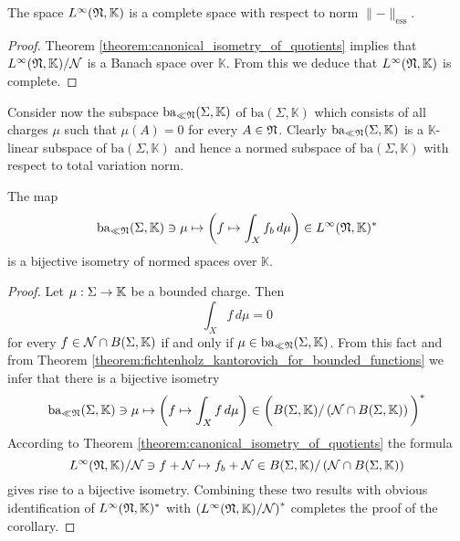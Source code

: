 \begin{corollary}\label{corollary:L_infty_is_complete}
    The space $L^{\infty}({\mathfrak N},\mathbb{K})$ is a complete space with respect to norm $\lVert - \rVert_{\mathrm{ess}}$.
\end{corollary}
\begin{proof}
    Theorem \ref{theorem:canonical_isometry_of_quotients} implies that $L^{\infty}({\mathfrak N},\mathbb{K})/{\mathcal N}$ is a Banach space over $\mathbb{K}$. From this we deduce that $L^{\infty}({\mathfrak N},\mathbb{K})$ is complete.
\end{proof}
\noindent
Consider now the subspace $\mathrm{ba}_{\ll {\mathfrak N}}(\Sigma, \mathbb{K})$ of $\mathrm{ba}(\Sigma, \mathbb{K})$ which consists of all charges $\mu$ such that $\mu(A) = 0$ for every $A \in {\mathfrak N}$. Clearly $\mathrm{ba}_{\ll {\mathfrak N}}(\Sigma, \mathbb{K})$ is a $\mathbb{K}$-linear subspace of $\mathrm{ba}(\Sigma, \mathbb{K})$ and hence a normed subspace of $\mathrm{ba}(\Sigma, \mathbb{K})$ with respect to total variation norm.

\begin{corollary}\label{corollary:functionals_for_L_infinity}
    The map
    $$\mathrm{ba}_{\ll {\mathfrak N}}(\Sigma, \mathbb{K}) \ni \mu \mapsto \left(f \mapsto \int_X f_b\,d\mu\right) \in L^{\infty}({\mathfrak N},\mathbb{K})^*$$
    is a bijective isometry of normed spaces over $\mathbb{K}$.
\end{corollary}
\begin{proof}
    Let $\mu:\Sigma \rightarrow \mathbb{K}$ be a bounded charge. Then
    $$\int_Xf\,d\mu = 0$$
    for every $f \in {\mathcal N} \cap B(\Sigma,\mathbb{K})$ if and only if $\mu \in \mathrm{ba}_{\ll {\mathfrak N}}(\Sigma, \mathbb{K})$. From this fact and from Theorem \ref{theorem:fichtenholz_kantorovich_for_bounded_functions} we infer that there is a bijective isometry
    $$\mathrm{ba}_{\ll {\mathfrak N}}(\Sigma, \mathbb{K}) \ni \mu \mapsto \left(f \mapsto \int_Xf \,d\mu\right) \in
        \bigg(B(\Sigma,\mathbb{K})/\left({\mathcal N}\cap B(\Sigma,\mathbb{K})\right)\bigg)^*$$
    According to Theorem \ref{theorem:canonical_isometry_of_quotients} the formula
    $$L^{\infty}({\mathfrak N},\mathbb{K})/{\mathcal N} \ni f + {\mathcal N} \mapsto f_b + {\mathcal N} \in B(\Sigma,\mathbb{K})/\left({\mathcal N}\cap B(\Sigma,\mathbb{K})\right)$$
    gives rise to a bijective isometry. Combining these two results with obvious identification of $L^{\infty}({\mathfrak N},\mathbb{K})^*$ with $\left(L^{\infty}({\mathfrak N},\mathbb{K})/{\mathcal N}\right)^*$ completes the proof of the corollary.
\end{proof}






\small



